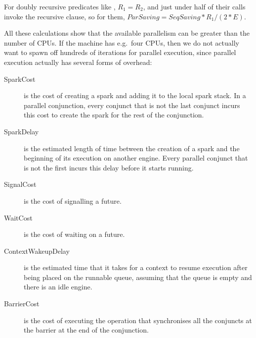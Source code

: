 {For doubly recursive predicates like , $R_1 = R_2$,
and just under half of their calls invoke the recursive clause,
so for them, ${ParSaving} = {SeqSaving} * R_1/(2 * E)$.

All these calculations show that the available parallelism
can be greater than the number of CPUs.
If the machine has e.g.\ four CPUs,
then we do not actually want to spawn off
hundreds of iterations for parallel execution,
since parallel execution actually has several forms of overhead:

\begin{description}
\item[SparkCost]
is the cost of creating a spark and adding it to the local spark stack.
In a parallel conjunction,
every conjunct that is not the last conjunct incurs this cost
to create the spark for the rest of the conjunction.
\item[SparkDelay]
is the estimated length of time between the creation of a spark
and the beginning of its execution on another engine.
Every parallel conjunct that is not the first incurs this delay
before it starts running.
\item[SignalCost]
is the cost of signalling a future.
\item[WaitCost]
is the cost of waiting on a future.
\item[ContextWakeupDelay]
is the estimated time that it takes for a context to resume execution
after being placed on the runnable queue,
assuming that the queue is empty and there is an idle engine.
\item[BarrierCost]
is the cost of executing the operation
that synchronises all the conjuncts at the barrier
at the end of the conjunction.
\end{description}

}
